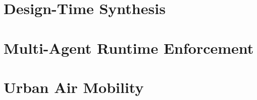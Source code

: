 \documentclass[12pt]{report}	%
\theoremstyle{definition}
\theoremstyle{remark}
\begin{document}


\part{Design-Time Synthesis}\setcounter{page}{10}
 \label{sec:SurveiilanceChapter}


\part{Multi-Agent Runtime Enforcement}




\part{Urban Air Mobility}






%
%
%
%
%
%
%
%




\end{document}
